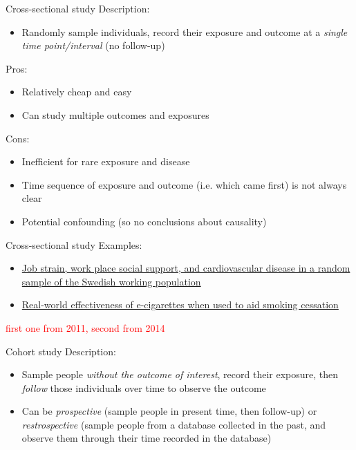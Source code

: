 \documentclass[10pt,t]{beamer}
\begin{document}
\begin{frame}{Cross-sectional study}
Description:
\begin{itemize}
	\item Randomly sample individuals, record their exposure and outcome at a \textit{single time point/interval} (no follow-up)
\end{itemize}
Pros:
\begin{itemize}
	\item Relatively cheap and easy
	\item Can study multiple outcomes and exposures
\end{itemize}
Cons:
\begin{itemize}
	\item Inefficient for rare exposure and disease 
	\item Time sequence of exposure and outcome (i.e. which came first) is not always clear
	\item Potential confounding (so no conclusions about causality)
\end{itemize}
\end{frame}

\begin{frame}[c]{Cross-sectional study}
Examples:
\vspace{0.3cm}

\begin{itemize}
	\item \href{http://ajph.aphapublications.org/doi/abs/10.2105/AJPH.78.10.1336}{\color{cyan} Job strain, work place social support, and cardiovascular disease in a random sample of the Swedish working population}
	\item \href{onlinelibrary.wiley.com/doi/10.1111/add.12623/full}{\color{cyan} Real-world effectiveness of e-cigarettes when used to aid smoking cessation}
\end{itemize}

\textcolor{red}{first one from 2011, second from 2014}

\end{frame}

\begin{frame}{Cohort study}
Description:
\begin{itemize}
	\item Sample people \textit{without the outcome of interest}, record their exposure, then \textit{follow} those individuals over time to observe the outcome
	\item Can be \textit{prospective} (sample people in present time, then follow-up) or \textit{restrospective} (sample people from a database collected in the past, and observe them through their time recorded in the database)
\end{itemize}
\end{frame}
\end{document}
